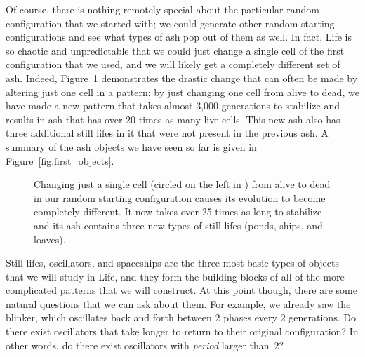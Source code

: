 Of course, there is nothing remotely special about the particular random configuration that we started with; we could generate other random starting configurations and see what types of ash pop out of them as well. In fact, Life is so chaotic and unpredictable that we could just change a single cell of the first configuration that we used, and we will likely get a completely different set of ash. Indeed, Figure~\ref{fig:random_2} demonstrates the drastic change that can often be made by altering just one cell in a pattern: by just changing one cell from alive to dead, we have made a new pattern that takes almost 3,000 generations to stabilize and results in ash that has over 20 times as many live cells. This new ash also has three additional still lifes in it that were not present in the previous ash. A summary of the ash objects we have seen so far is given in Figure~\ref{fig:first_objects}.

\begin{figure}[!ht]
	\centering{}
	\caption{Changing just a single cell (circled on the left in ) from alive to dead in our random starting configuration causes its evolution to become completely different. It now takes over 25 times as long to stabilize and its ash contains three new types of still lifes (ponds, ships, and loaves).}\label{fig:random_2}
\end{figure}

Still lifes, oscillators, and spaceships are the three most basic types of objects that we will study in Life, and they form the building blocks of all of the more complicated patterns that we will construct. At this point though, there are some natural questions that we can ask about them. For example, we already saw the blinker, which oscillates back and forth between $2$ phases every $2$ generations. Do there exist oscillators that take longer to return to their original configuration? In other words, do there exist oscillators with \emph{period} larger than~$2$?

